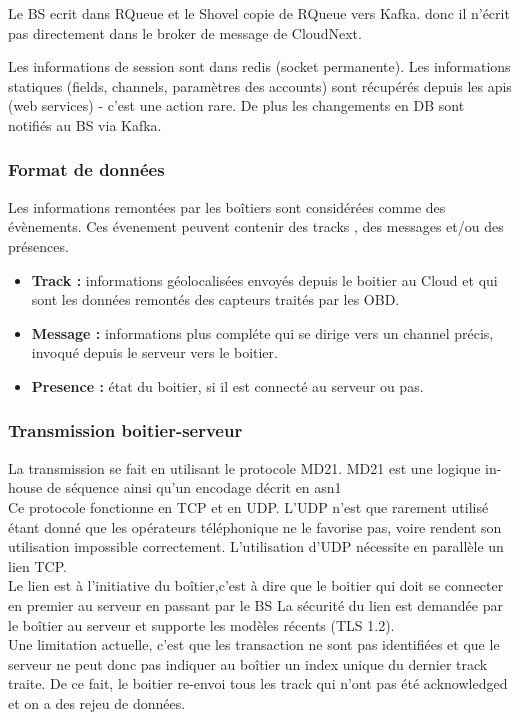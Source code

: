         Le BS ecrit dans RQueue et le Shovel copie de RQueue vers Kafka. donc il n'écrit pas directement dans le broker de message de CloudNext.


        Les informations de session sont dans redis (socket permanente).
        Les informations statiques (fields, channels, paramètres des accounts) sont récupérés depuis les apis (web services) - c’est une action rare.
        De plus les changements en DB sont notifiés au BS via Kafka.

        \subsubsection{Format de données}
        Les informations remontées par les boîtiers sont considérées comme des évènements. Ces évenement peuvent contenir 
        des tracks , des messages et/ou des présences.\\
        \begin{itemize}
            \renewcommand{\labelitemi}{$\bullet$}
            \item \textbf{Track :} informations géolocalisées envoyés depuis le boitier au Cloud et qui sont les données remontés des capteurs traités par les OBD. \\
            \item \textbf{Message :} informations plus compléte qui se dirige vers un channel précis, invoqué depuis le serveur vers le boitier.\\
            \item \textbf{Presence :} état du boitier, si il est connecté au serveur ou pas.\\
        \end{itemize}

        \subsubsection{Transmission boitier-serveur }
        La transmission se fait en utilisant le protocole MD21. MD21 est une logique in-house de séquence 
        ainsi qu’un encodage décrit en \gls{asn1}\\
        Ce protocole fonctionne en TCP et en UDP. L’UDP n’est que rarement utilisé étant 
        donné que les opérateurs téléphonique ne le favorise pas, voire rendent son utilisation impossible correctement.
        L’utilisation d’UDP nécessite en parallèle un lien TCP.\\
        Le lien est à l’initiative du boîtier,c'est à dire que le boitier qui doit se connecter en premier au serveur en passant par le \gls{BS}
        La sécurité du lien est demandée par le boîtier au serveur et supporte les modèles récents (TLS 1.2).\\
        Une limitation actuelle, c’est que les transaction ne sont pas identifiées et que le serveur ne peut donc pas indiquer 
        au boîtier un index unique du dernier track traite. De ce fait, le boitier re-envoi tous les track qui n’ont pas été 
        acknowledged et on a des rejeu de données.





       


       